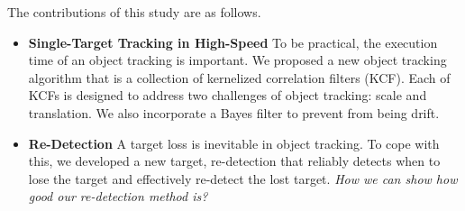 \documentclass[10pt,twocolumn,letterpaper]{article}
\newcounter{ct}
\begin{document}
The contributions of this study are as follows.
\begin{itemize}

\item \textbf{Single-Target Tracking in High-Speed} To be practical,
  the execution time of an object tracking is important. We proposed a
  new object tracking algorithm that is a collection of kernelized
  correlation filters (KCF). Each of KCFs is designed to address two
  challenges of object tracking: scale and translation. We also
  incorporate a Bayes filter to prevent from being drift.

\item \textbf{Re-Detection} A target loss is inevitable in object
  tracking. To cope with this, we developed a new target, re-detection
  that reliably detects when to lose the target and effectively
  re-detect the lost target. {\it How we can show how good our
    re-detection method is?}

\end{itemize}
\end{document}
